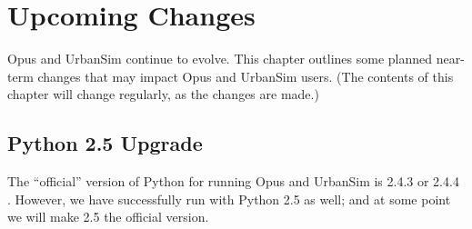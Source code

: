 

\chapter{Upcoming Changes}

Opus and UrbanSim continue to evolve.  This chapter outlines some planned
near-term changes that may impact Opus and UrbanSim users.  (The contents
of this chapter will change regularly, as the changes are made.)

\section{Python 2.5 Upgrade}

The ``official'' version of Python for running Opus and UrbanSim is 2.4.3 
or 2.4.4 \pythonversionindex.  However, we have successfully run with
Python 2.5 as well; and at some point we will make 2.5 the official version.
